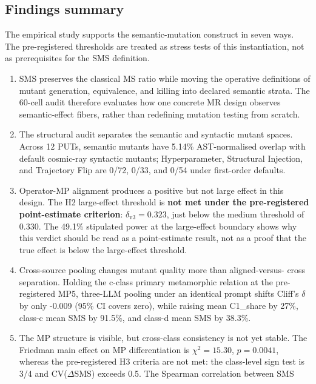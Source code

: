 \documentclass[acmsmall,screen,review]{acmart}
\begin{document}
\subsection{Findings summary}\label{findings-summary}

The empirical study supports the semantic-mutation construct in seven
ways. The pre-registered thresholds are treated as stress tests of this
instantiation, not as prerequisites for the SMS definition.

\begin{enumerate}
\def\labelenumi{(\alph{enumi})}
\item
  SMS preserves the classical MS ratio while moving the operative
  definitions of mutant generation, equivalence, and killing into
  declared semantic strata. The 60-cell audit therefore evaluates how
  one concrete MR design observes semantic-effect fibers, rather than
  redefining mutation testing from scratch.
\item
  The structural audit separates the semantic and syntactic mutant
  spaces. Across 12 PUTs, semantic mutants have 5.14\% AST-normalised
  overlap with default cosmic-ray syntactic mutants; Hyperparameter,
  Structural Injection, and Trajectory Flip are 0/72, 0/33, and 0/54
  under first-order defaults.
\item
  Operator-MP alignment produces a positive but not large effect in this
  design. The H2 large-effect threshold is \textbf{not met under the
  pre-registered point-estimate criterion}: \(\delta_{\mathrm{v3}} =
  0.323\), just below the \citet{romano2006cliff} medium threshold of
  0.330. The 49.1\% stipulated power at the large-effect boundary shows
  why this verdict should be read as a point-estimate result, not as a
  proof that the true effect is below the large-effect threshold.
\item
  Cross-source pooling changes mutant quality more than aligned-versus-
  cross separation. Holding the c-class primary metamorphic relation at
  the pre-registered MP5, three-LLM pooling under an identical prompt
  shifts Cliff's \(\delta\) by only -0.009 (95\% CI covers zero), while
  raising mean C1\_share by 27\%, class-c mean SMS by 91.5\%, and
  class-d mean SMS by 38.3\%.
\item
  The MP structure is visible, but cross-class consistency is not yet
  stable. The Friedman main effect on MP differentiation is
  \(\chi^2 = 15.30\), \(p = 0.0041\), whereas the pre-registered H3
  criteria are not met: the class-level sign test is 3/4 and
  CV(\(\Delta\)SMS) exceeds 0.5. The Spearman correlation between SMS

\end{enumerate}
\end{document}
